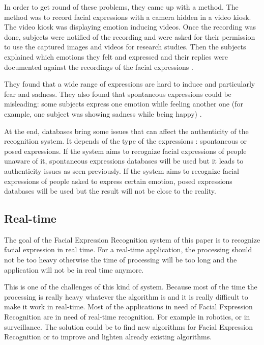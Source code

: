\vspace{\baselineskip}
\noindent In order to get round of these problems, they came up with a method. The method was to record facial expressions with a camera hidden in a video kiosk. The video kiosk was displaying emotion inducing videos. Once the recording was done, subjects were notified of the recording and were asked for their permission to use the captured images and videos for research studies. Then the subjects explained which emotions they felt and expressed and their replies were documented against the recordings of the facial expressions \cite{SEB07}.
\newline

\noindent They found that a wide range of expressions are hard to induce and particularly fear and sadness. They also found that spontaneous expressions could be misleading: some subjects express one emotion while feeling another one (for example, one subject was showing sadness while being happy) \cite{SEB07}.
\newline

\noindent At the end, databases bring some issues that can affect the authenticity of the recognition system. It depends of the type of the expressions : spontaneous or posed expressions. If the system aims to recognize facial expressions of people unaware of it, spontaneous expressions databases will be used but it leads to authenticity issues as seen previously. If the system aims to recognize facial expressions of people asked to express certain emotion, posed expressions databases will be used but the result will not be close to the reality.
\newline

\subsection{Real-time}

\vspace{\baselineskip}
\noindent The goal of the Facial Expression Recognition system of this paper is to recognize facial expression in real time. For a real-time application, the processing should not be too heavy otherwise the time of processing will be too long and the application will not be in real time anymore. 
\newline

\noindent This is one of the challenges of this kind of system. Because most of the time the processing is really heavy whatever the algorithm is and it is really difficult to make it work in real-time. Most of the applications in need of Facial Fxpression Recognition are in need of real-time recognition. For example in robotics, or in surveillance. The solution could be to find new algorithms for Facial Expression Recognition or to improve and lighten already existing algorithms.
\newline

